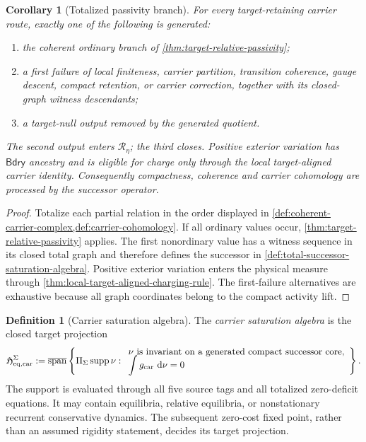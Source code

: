 \documentclass[11pt]{article}
\numberwithin{section}{part}
\theoremstyle{plain}
\newtheorem{corollary}[corollary]{Corollary}
\theoremstyle{definition}
\newtheorem{definition}[definition]{Definition}
\theoremstyle{remark}
\newcommand{\dd}{\,\mathrm d}
\newcommand{\Bdry}{\mathsf{Bdry}}
\DeclareMathOperator{\supp}{supp}
\begin{document}
\begin{corollary}[Totalized passivity branch]
\label{cor:totalized-passivity-branch}
For every target-retaining carrier route, exactly one of the following is
generated:
\begin{enumerate}[label=\textup{(T\arabic*)}]
\item the coherent ordinary branch of
  \cref{thm:target-relative-passivity};
\item a first failure of local finiteness, carrier partition, transition
  coherence, gauge descent, compact retention, or carrier correction,
  together with its closed-graph witness descendants;
\item a target-null output removed by the generated quotient.
\end{enumerate}
The second output enters \(\mathcal R_\eta\); the third closes.  Positive
exterior variation has \(\Bdry\) ancestry and is eligible for charge only
through the local target-aligned carrier identity.  Consequently compactness,
coherence and carrier cohomology are processed by the successor operator.
\end{corollary}

\begin{proof}
Totalize each partial relation in the order displayed in
\cref{def:coherent-carrier-complex,def:carrier-cohomology}.  If all ordinary
values occur, \cref{thm:target-relative-passivity} applies.  The first
nonordinary value has a witness sequence in its closed total graph and
therefore defines the successor in
\cref{def:total-successor-saturation-algebra}.  Positive exterior variation
enters the physical measure through
\cref{thm:local-target-aligned-charging-rule}.  The first-failure alternatives are exhaustive
because all graph coordinates belong to the compact activity lift.
\end{proof}

\begin{definition}[Carrier saturation algebra]
\label{def:carrier-saturation-algebra}
The \emph{carrier saturation algebra} is the closed target projection
\begin{equation}
 \label{eq:carrier-saturation-algebra}
 \mathfrak H_{\rm eq,car}^{\Sigma}
 :=\overline{\operatorname{span}}
 \left\{
   \Pi_\Sigma\supp\nu:
   \begin{array}{l}
   \nu\text{ is invariant on a generated compact successor core},\\[-1mm]
   \displaystyle\int g_{\rm car}\,\dd\nu=0
   \end{array}
 \right\}.
\end{equation}
The support is evaluated through all five source tags and all totalized
zero-deficit equations.  It may contain equilibria, relative equilibria, or
nonstationary recurrent conservative dynamics.  The subsequent zero-cost
fixed point, rather than an assumed rigidity statement, decides its target
projection.
\end{definition}
\end{document}
